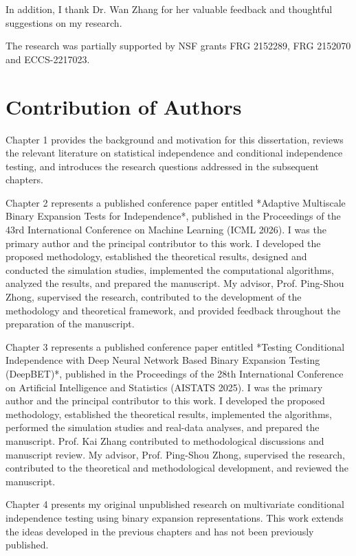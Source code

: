 \documentclass[12pt,reqno,oneside]{amsbook}
\theoremstyle{definition}
\theoremstyle{remark}
\begin{document}
In addition, I thank Dr. Wan Zhang for her valuable feedback and thoughtful suggestions on my research.

The research was partially supported by NSF grants FRG 2152289, FRG 2152070 and ECCS-2217023.

\chapter*{Contribution of Authors}


Chapter 1 provides the background and motivation for this dissertation, reviews the relevant literature on statistical independence and conditional independence testing, and introduces the research questions addressed in the subsequent chapters.

Chapter 2 represents a published conference paper entitled *Adaptive Multiscale Binary Expansion Tests for Independence*, published in the Proceedings of the 43rd International Conference on Machine Learning (ICML 2026). I was the primary author and the principal contributor to this work. I developed the proposed methodology, established the theoretical results, designed and conducted the simulation studies, implemented the computational algorithms, analyzed the results, and prepared the manuscript. My advisor, Prof. Ping-Shou Zhong, supervised the research, contributed to the development of the methodology and theoretical framework, and provided feedback throughout the preparation of the manuscript.

Chapter 3 represents a published conference paper entitled *Testing Conditional Independence with Deep Neural Network Based Binary Expansion Testing (DeepBET)*, published in the Proceedings of the 28th International Conference on Artificial Intelligence and Statistics (AISTATS 2025). I was the primary author and the principal contributor to this work. I developed the proposed methodology, established the theoretical results, implemented the algorithms, performed the simulation studies and real-data analyses, and prepared the manuscript. Prof. Kai Zhang contributed to methodological discussions and manuscript review. My advisor, Prof. Ping-Shou Zhong, supervised the research, contributed to the theoretical and methodological development, and reviewed the manuscript.

Chapter 4 presents my original unpublished research on multivariate conditional independence testing using binary expansion representations. This work extends the ideas developed in the previous chapters and has not been previously published.
\end{document}
